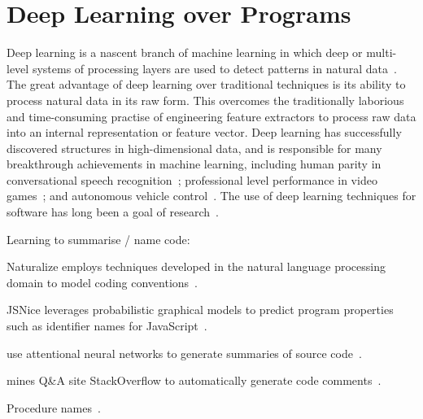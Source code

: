 \section{Deep Learning over Programs}
\label{sec:related-work-other}

Deep learning is a nascent branch of machine learning in which deep or multi-level systems of processing layers are used to detect patterns in natural data~\cite{LeCun2015,Wang2017}. The great advantage of deep learning over traditional techniques is its ability to process natural data in its raw form. This overcomes the traditionally laborious and time-consuming practise of engineering feature extractors to process raw data into an internal representation or feature vector. Deep learning has successfully discovered structures in high-dimensional data, and is responsible for many breakthrough achievements in machine learning, including human parity in conversational speech recognition~\cite{Xiong2016}; professional level performance in video games~\cite{Mnih2015}; and autonomous vehicle control~\cite{Lozano-Perez2012}. The use of deep learning techniques for software has long been a goal of research~\cite{White2015a}.


Learning to summarise / name code:

\cite{Allamanis2017a}

Naturalize employs techniques developed in the natural language processing domain to model coding conventions~\cite{Allamanis2014a}.

JSNice leverages probabilistic graphical models to predict program properties such as identifier names for JavaScript~\cite{Raychev}.

\citeauthor{Allamanis2016} use attentional neural networks to generate summaries of source code~\cite{Allamanis2016}.

\citeauthor{Wong2013} mines Q\&A site StackOverflow to automatically generate code comments~\cite{Wong2013}.

Procedure names~\cite{David}.

